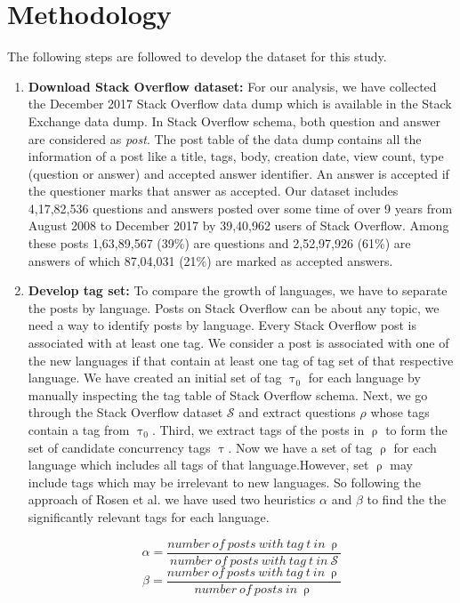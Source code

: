 \section{Methodology}
\label{sec:dataset preparation}
The following steps are followed to develop the dataset for this study.

\begin{enumerate}
    \item \textbf{Download Stack Overflow dataset:} For our analysis, we have collected the December 2017 Stack Overflow data dump which is available in the Stack Exchange data dump. In Stack Overflow schema, both question and answer are considered as \emph{post}. The post table of the data dump contains all the information of a post like a title, tags, body, creation date, view count, type (question or answer) and accepted answer identifier. An answer is accepted if the questioner marks that answer as accepted. Our dataset includes 4,17,82,536 questions and answers posted over some time of over 9 years from August 2008 to December 2017 by 39,40,962 users of Stack Overflow. Among these posts 1,63,89,567 (39\%) are questions and 2,52,97,926 (61\%) are answers of which 87,04,031 (21\%) are marked as accepted answers.
    
 
    \item \textbf{Develop tag set:} To compare the growth of languages, we have to separate the posts by language. Posts on Stack Overflow can be about any topic, we need a way to identify posts by language. Every Stack Overflow post is associated with at least one tag. We consider a post is associated with one of the new languages if that contain at least one tag of tag set of that respective language. We have created an initial set of tag $\uptau_0$ for each language by manually inspecting the tag table of Stack Overflow schema. Next, we go through the Stack Overflow dataset $\mathcal{S}$ and extract questions $\rho$ whose tags contain a tag from  $\uptau_0$. Third, we extract tags of the posts in $\uprho$ to form the set of candidate concurrency tags $\uptau$. Now we have a set of tag $\uprho$ for each language which includes all tags of that language.However, set $\uprho$ may include tags which may be irrelevant to new languages. So following the  approach of Rosen et al.\citep{Rosen2015} we have  used two heuristics $\alpha$ and $\beta$ to find the the significantly relevant tags for each language. 
    
    \begin{equation}
        \alpha = \dfrac{number \ of \ posts \ with \ tag \ t \ in \ \uprho}{number \ of \ posts \ with \ tag \ t \ in \ \mathcal{S}}
    \end{equation}
    \begin{equation}
         \beta = \dfrac{number \ of \ posts \ with \ tag \ t \ in \ \uprho}{number \ of \ posts \ in \ \uprho}
    \end{equation}


\end{enumerate}
